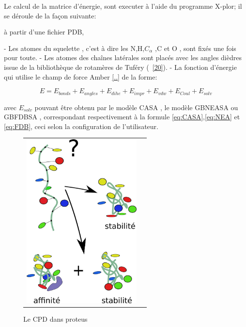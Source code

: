 Le calcul de la matrice d'énergie, sont executer à l'aide du programme X-plor; il se déroule de la façon suivante:

à partir d'une fichier PDB,


- Les atomes du squelette , c'est à dire les N,H,$C_\alpha$ ,C et O , sont fixés une fois pour toute. 
- Les atomes des chaînes latérales sont placés avec les angles dièdres issue de la bibliothèque de rotamères de Tuféry (~\ref{20}).
- La fonction d'énergie qui utilise le champ de force Amber \ref{..} de la forme:

\begin{equation} \label{eq:energy}
E = E_{bonds} + E_{angles} + E_{dihe} + E_{impr} + E_{vdw} + E_{Coul} + E_{solv} 
\end{equation}

avec $E_{solv}$ pouvant être obtenu par le modèle CASA , le modèle GBNEASA ou GBFDBSA , correspondant respectivement à la formule \ref{eq:CASA},\ref{eq:NEA} et \ref{eq:FDB}, ceci selon la configuration de l'utilisateur.

   \begin{figure}[t]
     \centering
     \begin{tabular}{cc}
       \includegraphics[width=6cm]{graphe/proteus/CPD.png} &
     \end{tabular}
     
     \caption{Le CPD dans proteus}
\label{graph:struct_Phy}
   \end{figure}


